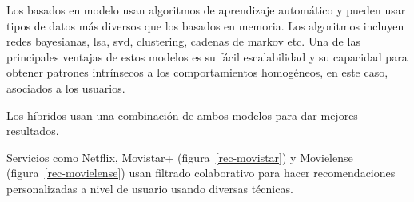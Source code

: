 \documentclass[withindex, glossary]{cam-thesis}
\begin{document}
Los basados en modelo usan algoritmos de aprendizaje automático y pueden usar tipos de datos más diversos que los basados en memoria. Los algoritmos incluyen redes bayesianas, \acrshort{lsa}, \acrshort{svd}, clustering, cadenas de markov etc. Una de las principales ventajas de estos modelos es su fácil escalabilidad\cite{sk09} y su capacidad para obtener patrones intrínsecos a los comportamientos homogéneos\cite{GARCACUESTA2011}, en este caso, asociados a los usuarios.

Los híbridos usan una combinación de ambos modelos para dar mejores resultados.

Servicios como Netflix, Movistar+ (figura~\ref{rec-movistar}) y Movielense (figura~\ref{rec-movielense}) usan filtrado colaborativo para hacer recomendaciones personalizadas a nivel de usuario usando diversas técnicas.
\end{document}
